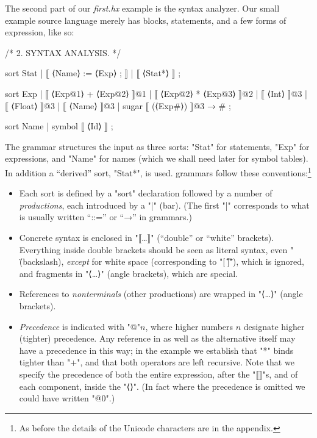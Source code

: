 \documentclass[11pt]{article} %
\begin{document}
\begin{example}\label{ex:syntax}
  The second part of our \emph{first.hx} example is the syntax analyzer. Our small example source
  language merely has blocks, statements, and a few forms of expression, like so:
\begin{code}[xleftmargin=1.66em,numbers=left]
/* 2. SYNTAX ANALYSIS. */

sort Stat  | ⟦ ⟨Name⟩ := ⟨Exp⟩ ; ⟧ | ⟦ { ⟨Stat*⟩ } ⟧ ;

sort Exp   | ⟦ ⟨Exp@1⟩ + ⟨Exp@2⟩ ⟧@1
           | ⟦ ⟨Exp@2⟩ * ⟨Exp@3⟩ ⟧@2
           | ⟦ ⟨Int⟩ ⟧@3
           | ⟦ ⟨Float⟩ ⟧@3
           | ⟦ ⟨Name⟩ ⟧@3
           | sugar ⟦ (⟨Exp#⟩) ⟧@3 → # ;

sort Name  | symbol ⟦ ⟨Id⟩ ⟧ ;
\end{code}
  The grammar structures the input as three sorts: "Stat" for statements, "Exp" for expressions, and
  "Name" for names (which we shall need later for symbol tables).  In addition a ``derived'' sort,
  "Stat*", is used. \HAX grammars follow these conventions:\footnote{As before the details of the
    Unicode characters are in the appendix.}
  \begin{itemize}

  \item Each sort is defined by a "sort" declaration followed by a number of \emph{productions},
    each introduced by a "|" (bar). (The first "|" corresponds to what is usually written ``::='' or
    ``→'' in grammars.)

  \item Concrete syntax is enclosed in "⟦…⟧" (``double'' or ``white'' brackets). Everything inside
    double brackets should be seen as literal syntax, even "\" (backslash), \emph{except} for \HAX
    white space (corresponding to "[ \t\n\r]"), which is ignored, and fragments in "⟨…⟩" (angle
    brackets), which are special.

  \item References to \emph{nonterminals} (other productions) are wrapped in "⟨…⟩" (angle brackets).

  \item \emph{Precedence} is indicated with "@"$n$, where higher numbers $n$ designate higher
    (tighter) precedence.  Any reference in as well as the alternative itself may have a precedence
    in this way; in the example we establish that "*" binds tighter than "+", and that both
    operators are left recursive. Note that we specify the precedence of both the entire expression,
    after the "⟦⟧"s, and of each component, inside the "⟨⟩". (In fact where the precedence is
    omitted we could have written "@0".)


\end{itemize}
\end{example}
\end{document}
